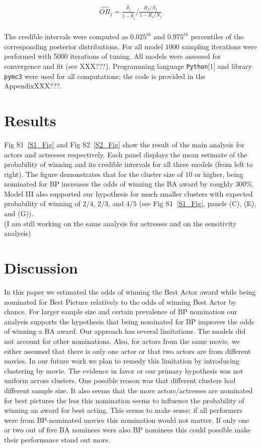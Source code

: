 \documentclass[10pt,letterpaper]{article}
\begin{document}
\begin{align*}
	\widehat{OR}_j =  \frac{\hat{\theta}_j}{1 - \hat{\theta}_j}  \bigg/  \frac{R_j/N_j}{1 - R_j/N_j} \\
\end{align*}


The credible intervals were computed as $0.025^{th}$ and $0.975^{th}$ percentiles of the corresponding posterior distributions. For all model $1000$ sampling iterations were performed with $5000$ iterations of tuning. All models were assessed for convergence and fit (see XXX???). Programming language \texttt{Python}[1] and library \texttt{pymc3} were used for all computations; the code is provided in the AppendixXXX???.


\section*{Results}
Fig S1~\ref{S1_Fig} and Fig S2~\ref{S2_Fig} show the result of the main analysis for actors and actresses respectively. Each panel displays the mean estimate of the probability of winning and its credible intervals for all three models (from left to right). The figure demonstrates that for the cluster size of $10$ or higher, being nominated for BP increases the odds of winning the BA award by roughly $300\%$. Model III also supported our hypothesis for much smaller clusters with expected probability of winning of $2/4$, $2/3$, and $4/5$  (see Fig S1~\ref{S1_Fig}, panels (C), (E), and (G)). %
~\\
(I am still working on the same analysis for actresses and on the sensitivity analysis)

\section*{Discussion}
In this paper we estimated the odds of winning the Best Actor award while being nominated for Best Picture relatively to the odds of winning Best Actor by chance. For larger sample size and certain prevalence of BP nomination our analysis supports the hypothesis that being nominated for BP improves the odds of winning a BA award. 
Our approach has several limitations. The models did not account for other nominations. Also, for actors from the same movie, we either assumed that there is only one actor or that two actors are from different movies. In our future work we plan to remedy this limitation by introducing clustering by movie. 
The evidence in favor or our primary hypothesis was not uniform across clusters. One possible reason was that different clusters had different sample size. It also seems that the more actors/actresses are nominated for best pictures the less this nomination seems to influence the probability of winning an award for best acting. This seems to make sense: if all performers were from BP-nominated movies this nomination would not matter. If only one or two out of five BA nominees were also BP nominees this could possible make their performance stand out more.
\end{document}
